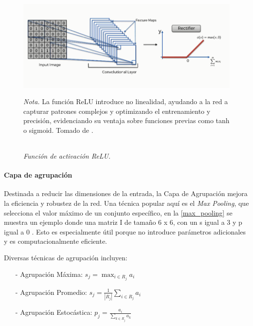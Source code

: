                     \begin{figure}[H] 
                        \caption{\doublespacing \\ \textit{Función de activación ReLU.}} 
                        \centering
                        \includegraphics[width=1\linewidth]{2_CAPITULO0//IMG/relu.png}
                        \begin{justify}
                            \textit{Nota.} La función ReLU introduce no linealidad, ayudando a la red a capturar patrones complejos y optimizando el entrenamiento y precisión, evidenciando su ventaja sobre funciones previas como tanh o sigmoid. Tomado de \textcite{Kalita2022}.
                        \end{justify}                    
                        \label{relu}
                    \end{figure}
                
                \paragraph{Capa de agrupación}
                    Destinada a reducir las dimensiones de la entrada, la Capa de Agrupación mejora la eficiencia y robustez de la red. Una técnica popular aquí es el \textit{Max Pooling}, que selecciona el valor máximo de un conjunto específico, en la \autoref{max_pooling} se muestra un ejemplo donde una matriz I de tamaño 6 x 6, con un s igual a 3 y p igual a 0 . Esto es especialmente útil porque no introduce parámetros adicionales y es computacionalmente eficiente.
                    
                    Diversas técnicas de agrupación incluyen:
                    
                    \begin{itemize}
                        \item[-] Agrupación Máxima: \( s_j = \max_{i \in R_j} a_i \)
                        \item[-] Agrupación Promedio: \( s_j = \frac{1}{|R_j|} \sum_{i \in R_j} a_i \)
                        \item[-] Agrupación Estocástica: \( p_j = \frac{a_i}{\sum_{k \in R_j} a_k} \)
                    \end{itemize}

